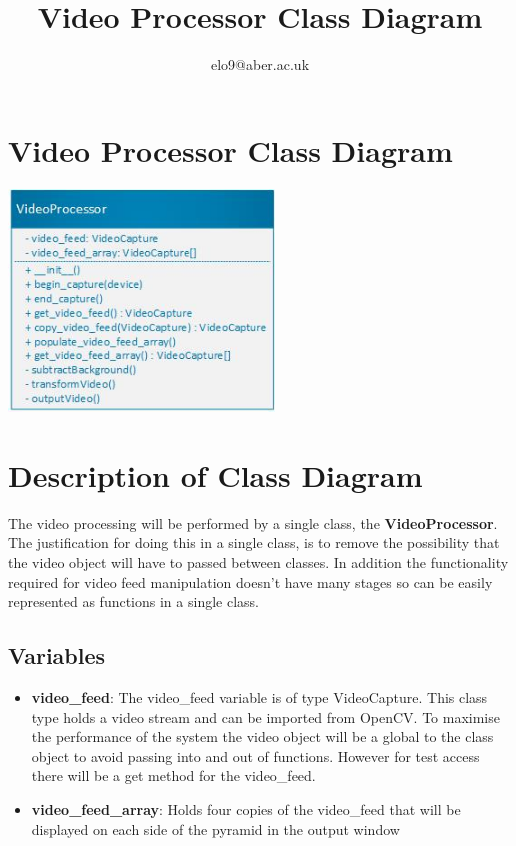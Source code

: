 \documentclass{article}
\title{Video Processor Class Diagram}
\author{elo9@aber.ac.uk}
\begin{document}
\maketitle
\tableofcontents

\newpage

\section{Video Processor Class Diagram}
\includegraphics[width=200pt]{VideoProcessorClassDiagramImage}


\section{Description of Class Diagram}
The video processing will be performed by a single class, the \textbf{VideoProcessor}. The justification for doing this in a single class, is to remove the possibility that the video object will have to passed between classes. In addition the functionality required for video feed manipulation doesn't have many stages so can be easily represented as functions in a single class.

\subsection{Variables}
\begin{itemize}

	\item \textbf{video\_feed}: The video\_feed variable is of type VideoCapture. This class type holds a video stream and can be imported from OpenCV. To maximise the performance of the system the video object will be a global to the class object to avoid passing into and out of functions. However for test access there will be a get method for the video\_feed.

	\item \textbf{video\_feed\_array}: Holds four copies of the video\_feed that will be displayed on each side of the pyramid in the output window
	
\end{itemize}
\end{document}
